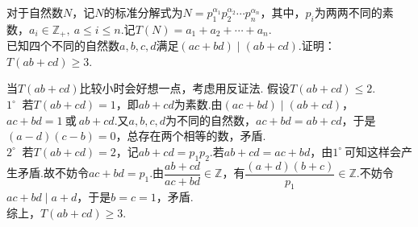 \documentclass[cn,hazy,black,10pt,normal]{elegantnote}
\newenvironment{guess}{
  \color{guess}}{\newline \color{black}}
\newcommand{\cor}{~\textit{或}~}
\newcommand{\buzhou}[1]{$#1^{\circ} \ $}
\begin{document}
\begin{problem} %
	对于自然数$N$，记$N$的标准分解式为$N=p_1^{\alpha _1}p_2^{\alpha _2} \cdots p_n^{\alpha _n}$，其中，$p_i$为两两不同的素数，$a_i \in \mathbb{Z}_{+},~a \leq i \leq n$.记$T(N)=a_1+a_2+ \cdots + a_n$. \\
	已知四个不同的自然数$a,b,c,d$满足$(ac+bd) \mid (ab+cd)$.证明：$T(ab+cd) \geq 3$.
\end{problem}
\begin{solution}
	\begin{guess}
		当$T(ab+cd)$比较小时会好想一点，考虑用反证法.
	\end{guess}
	假设$T(ab+cd) \leq 2$. \\
	\buzhou{1} 若$T(ab+cd)=1$，即$ab+cd$为素数.由$(ac+bd) \mid (ab+cd)$，$ac+bd=1\cor ab+cd$.又$a,b,c,d$为不同的自然数，$ac+bd=ab+cd$，于是$(a-d)(c-b)=0$，总存在两个相等的数，矛盾. \\
	\buzhou{2} 若$T(ab+cd)=2$，记$ab+cd=p_1p_2$.若$ab+cd=ac+bd$，由\buzhou{1}可知这样会产生矛盾.故不妨令$ac+bd=p_1$.由$\dfrac{ab+cd}{ac+bd} \in \mathbb{Z}$，有$\dfrac{(a+d)(b+c)}{p_1} \in \mathbb{Z}$.不妨令$ac+bd \mid a+d$，于是$b=c=1$，矛盾. \\
	综上，$T(ab+cd) \geq 3$.
\end{solution}
\end{document}
